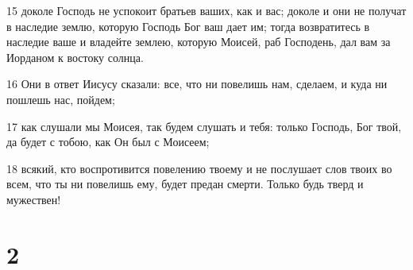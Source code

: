 \par 15 доколе Господь не успокоит братьев ваших, как и вас; доколе и они не получат в наследие землю, которую Господь Бог ваш дает им; тогда возвратитесь в наследие ваше и владейте землею, которую Моисей, раб Господень, дал вам за Иорданом к востоку солнца.
\par 16 Они в ответ Иисусу сказали: все, что ни повелишь нам, сделаем, и куда ни пошлешь нас, пойдем;
\par 17 как слушали мы Моисея, так будем слушать и тебя: только Господь, Бог твой, да будет с тобою, как Он был с Моисеем;
\par 18 всякий, кто воспротивится повелению твоему и не послушает слов твоих во всем, что ты ни повелишь ему, будет предан смерти. Только будь тверд и мужествен!

\chapter{2}

